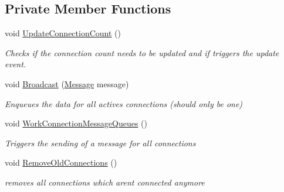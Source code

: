 \subsection*{Private Member Functions}
\begin{DoxyCompactItemize}
\item 
void \hyperlink{class_web_analyzer_1_1_server_1_1_connection_manager_a68db2e8493dd838aec226f40db1d5a6e}{Update\+Connection\+Count} ()
\begin{DoxyCompactList}\small\item\em Checks if the connection count needs to be updated and if triggers the update event. \end{DoxyCompactList}\item 
void \hyperlink{class_web_analyzer_1_1_server_1_1_connection_manager_a802503ffd29cf9a18a2bfae95adc4b4e}{Broadcast} (\hyperlink{class_web_analyzer_1_1_models_1_1_message_model_1_1_message}{Message} message)
\begin{DoxyCompactList}\small\item\em Enqueues the data for all actives connections (should only be one) \end{DoxyCompactList}\item 
void \hyperlink{class_web_analyzer_1_1_server_1_1_connection_manager_a773422b69490cf64139d8237a9122eaa}{Work\+Connection\+Message\+Queues} ()
\begin{DoxyCompactList}\small\item\em Triggers the sending of a message for all connections \end{DoxyCompactList}\item 
void \hyperlink{class_web_analyzer_1_1_server_1_1_connection_manager_a2c3ef15396b89a8ec145e62158348faf}{Remove\+Old\+Connections} ()
\begin{DoxyCompactList}\small\item\em removes all connections which aren\textquotesingle{}t connected anymore \end{DoxyCompactList}\end{DoxyCompactItemize}
